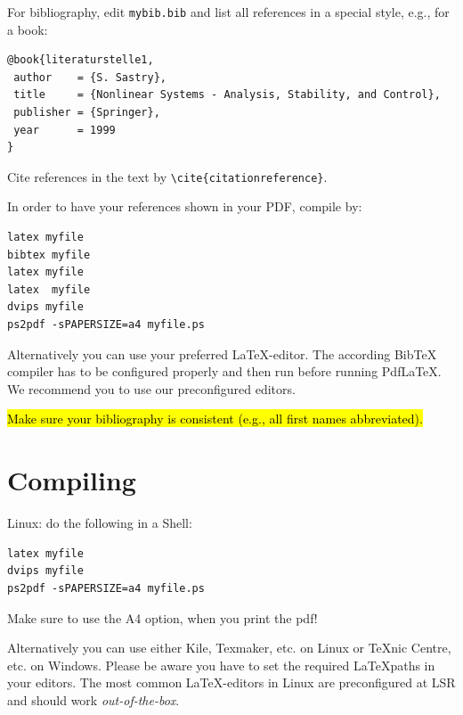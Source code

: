For bibliography, edit {\tt mybib.bib} and list all
references in a special style, e.g., for a book: 
\begin{verbatim}
@book{literaturstelle1,
 author    = {S. Sastry},
 title     = {Nonlinear Systems - Analysis, Stability, and Control},
 publisher = {Springer},
 year      = 1999
}
\end{verbatim}

Cite references in the text by \verb|\cite{citationreference}|.

In order to have your references shown in your PDF, compile by:

\begin{verbatim} 
latex myfile
bibtex myfile
latex myfile
latex  myfile
dvips myfile
ps2pdf -sPAPERSIZE=a4 myfile.ps
\end{verbatim}

Alternatively you can use your preferred \LaTeX -editor. The according BibTeX compiler has to be configured properly and then run before running PdfLaTeX. We recommend you to use our preconfigured editors.

\hl{Make sure your bibliography is consistent (e.g., all first names abbreviated).}

\section{Compiling}
Linux: 
do the following in a Shell:\\
\begin{verbatim}
latex myfile
dvips myfile
ps2pdf -sPAPERSIZE=a4 myfile.ps
\end{verbatim}
Make sure to use the A4 option, when you print the pdf!

Alternatively you can use either Kile, Texmaker, etc. on Linux or TeXnic Centre, etc. on Windows. Please be aware you have to set the required \LaTeX paths in your editors. The most common \LaTeX -editors in Linux are preconfigured at LSR and should work \emph{out-of-the-box}.




